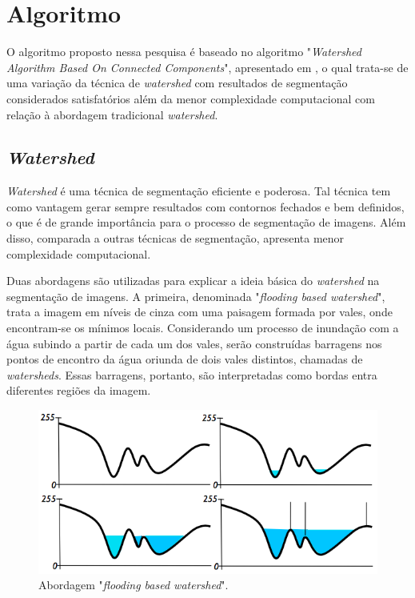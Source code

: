 \chapter{Algoritmo}\label{cap:algoritmo}

O algoritmo proposto nessa pesquisa é baseado no algoritmo "\textit{Watershed Algorithm Based On Connected Components}", apresentado em \cite{ruparelia2012implementation}, o qual trata-se de uma variação da técnica de \textit{watershed} com resultados de segmentação considerados satisfatórios além da menor complexidade computacional com relação à abordagem tradicional \textit{watershed}.

\section{\textit{Watershed}}\label{sec:watershed}
\textit{Watershed} é uma técnica de segmentação eficiente e poderosa. Tal técnica tem como vantagem gerar sempre resultados com contornos fechados e bem definidos, o que é de grande importância para o processo de segmentação de imagens. Além disso, comparada a outras técnicas de segmentação, apresenta menor complexidade computacional.

Duas abordagens são utilizadas para explicar a ideia básica do \textit{watershed} na segmentação de imagens. 
A primeira, denominada "\textit{flooding based watershed}", trata a imagem em níveis de cinza com uma paisagem formada por vales, onde encontram-se os mínimos locais. Considerando um processo de inundação com a água subindo a partir de cada um dos vales, serão construídas barragens nos pontos de encontro da água oriunda de dois vales distintos, chamadas de \textit{watersheds}. Essas barragens, portanto, são interpretadas como bordas entra diferentes regiões da imagem.\citep{l6} 

	\begin{figure}[!htb]
       \begin{center}  
          \includegraphics[width=0.6\columnwidth]{img/abordagem_flooding.jpg}
           \caption{\label{fig:abordagem_flooding}Abordagem "\textit{flooding based watershed}".\cite{regseg1}}
       \end{center}
   \end{figure} 


